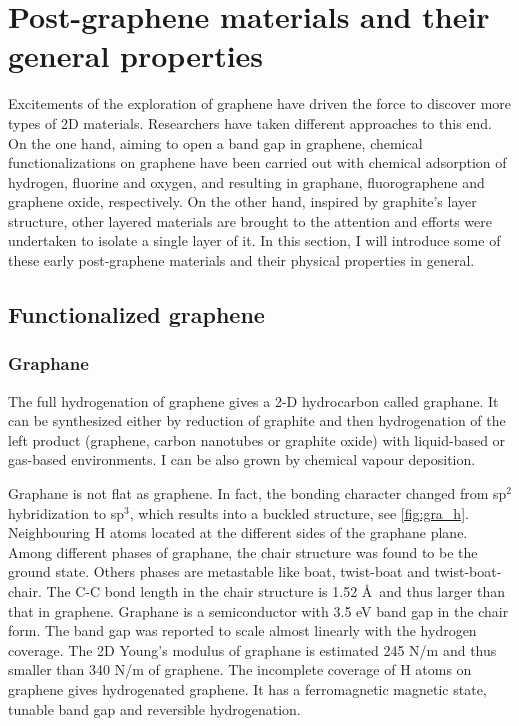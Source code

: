 \section{Post-graphene materials and their general properties}

Excitements of the exploration of graphene have driven the force to discover more types of 2D materials. Researchers have taken different approaches to this end. On the one hand, aiming to open a band gap in graphene, chemical functionalizations on graphene have been carried out with chemical adsorption of hydrogen, fluorine and oxygen, and resulting in graphane, fluorographene and graphene oxide, respectively. On the other hand, inspired by graphite's layer structure, other layered materials are brought to the attention and efforts were undertaken to isolate a single layer of it. In this section, I will introduce some of these early post-graphene materials and their physical properties in general.

\subsection{Functionalized graphene}

\subsubsection{Graphane}

The full hydrogenation of graphene gives a 2-D hydrocarbon called graphane. It can be synthesized either by reduction of graphite and then hydrogenation of the left product (graphene, carbon nanotubes or graphite oxide) with liquid-based\cite{Yang2012} or gas-based\cite{Burgess2011} environments. I can be also grown by chemical vapour deposition\cite{wang2010}. 

Graphane is not flat as graphene. In fact, the bonding character changed from sp$^2$ hybridization to sp$^3$, which results into a buckled structure, see \autoref{fig:gra_h}. Neighbouring H atoms located at the different sides of the graphane plane. Among different phases of graphane, the chair structure was found to be the ground state. Others phases are metastable like boat, twist-boat and twist-boat-chair\cite{Samarakoon2009}. The C-C bond length in the chair structure is 1.52 \AA~and thus larger than that in graphene. Graphane is a semiconductor with 3.5 eV band gap in the chair form. The band gap was reported to scale almost linearly with the hydrogen coverage\cite{Ilyin2011}. The 2D Young's modulus of graphane is estimated 245 \si{N/m}\cite{Munoz2010} and thus smaller than 340 \si{N/m} of graphene. The incomplete coverage of H atoms on graphene gives hydrogenated graphene. It has a ferromagnetic magnetic state\cite{Zhou2009}, tunable band gap\cite{Shkrebtii2011} and reversible hydrogenation\cite{Elias2009}. 


